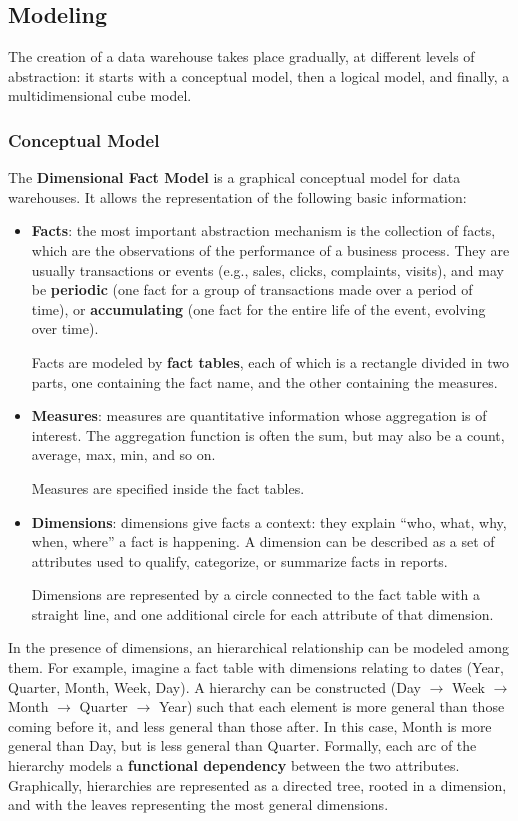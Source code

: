 \subsection{Modeling}

The creation of a data warehouse takes place gradually, at different levels of abstraction: it starts with a conceptual model, then a logical model, and finally, a multidimensional cube model.

\subsubsection{Conceptual Model}

The \textbf{Dimensional Fact Model} is a graphical conceptual model for data warehouses. It allows the representation of the following basic information:
\begin{itemize}
    \item \textbf{Facts}: the most important abstraction mechanism is the collection of facts, which are the observations of the performance of a business process. They are usually transactions or events (e.g., sales, clicks, complaints, visits), and may be \textbf{periodic} (one fact for a group of transactions made over a period of time), or \textbf{accumulating} (one fact for the entire life of the event, evolving over time).
    
    Facts are modeled by \textbf{fact tables}, each of which is a rectangle divided in two parts, one containing the fact name, and the other containing the measures.
    
    \item \textbf{Measures}: measures are quantitative information whose aggregation is of interest. The aggregation function is often the sum, but may also be a count, average, max, min, and so on.

    Measures are specified inside the fact tables.
    
    \item \textbf{Dimensions}: dimensions give facts a context: they explain ``who, what, why, when, where'' a fact is happening. A dimension can be described as a set of attributes used to qualify, categorize, or summarize facts in reports.

    Dimensions are represented by a circle connected to the fact table with a straight line, and one additional circle for each attribute of that dimension.
\end{itemize}
In the presence of dimensions, an hierarchical relationship can be modeled among them. For example, imagine a fact table with dimensions relating to dates (Year, Quarter, Month, Week, Day). A hierarchy can be constructed (Day $\rightarrow$ Week $\rightarrow$ Month $\rightarrow$ Quarter $\rightarrow$ Year) such that each element is more general than those coming before it, and less general than those after. In this case, Month is more general than Day, but is less general than Quarter. Formally, each arc of the hierarchy models a \textbf{functional dependency} between the two attributes. Graphically, hierarchies are represented as a directed tree, rooted in a dimension, and with the leaves representing the most general dimensions.

